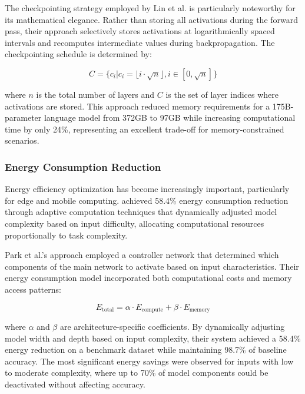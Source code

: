 \documentclass[acmsmall]{acmart}
\begin{document}
The checkpointing strategy employed by Lin et al. \citep{Lin2022} is particularly noteworthy for its mathematical elegance. Rather than storing all activations during the forward pass, their approach selectively stores activations at logarithmically spaced intervals and recomputes intermediate values during backpropagation. The checkpointing schedule is determined by:

\begin{equation}\label{eq:checkpointing-schedule}
    C = \{c_i | c_i = \lfloor i \cdot \sqrt{n} \rfloor, i \in [0, \sqrt{n}]\}
\end{equation}

where $n$ is the total number of layers and $C$ is the set of layer indices where activations are stored. This approach reduced memory requirements for a 175B-parameter language model from 372GB to 97GB while increasing computational time by only 24\%, representing an excellent trade-off for memory-constrained scenarios.

\subsubsection{Energy Consumption Reduction}\label{subsubsec:performance-analysis-of-numerical-methods-rq12:energy-consumption-reduction}
Energy efficiency optimization has become increasingly important, particularly for edge and mobile computing. \citet{Park2022} achieved 58.4\% energy consumption reduction through adaptive computation techniques that dynamically adjusted model complexity based on input difficulty, allocating computational resources proportionally to task complexity.

Park et al.'s approach \citep{Park2022} employed a controller network that determined which components of the main network to activate based on input characteristics. Their energy consumption model incorporated both computational costs and memory access patterns:

\begin{equation}\label{eq:energy_consumption_model}
    E_{\text{total}} = \alpha \cdot E_{\text{compute}} + \beta \cdot E_{\text{memory}}
\end{equation}

where $\alpha$ and $\beta$ are architecture-specific coefficients. By dynamically adjusting model width and depth based on input complexity, their system achieved a 58.4\% energy reduction on a benchmark dataset while maintaining 98.7\% of baseline accuracy. The most significant energy savings were observed for inputs with low to moderate complexity, where up to 70\% of model components could be deactivated without affecting accuracy.
\end{document}
